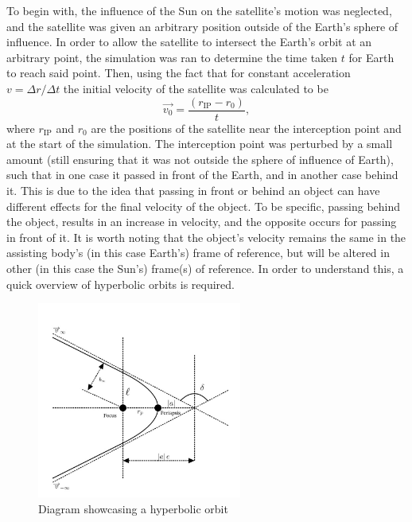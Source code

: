\documentclass[12pt, english]{report}
\begin{document}
{To begin with, the influence of the Sun on the satellite's motion was neglected, and the satellite was given an arbitrary position outside of the Earth's sphere of influence. In order to allow the satellite to intersect the Earth's orbit at an arbitrary point, the simulation was ran to determine the time taken $t$ for Earth to reach said point. Then, using the fact that for constant acceleration $v = \Delta r / \Delta t$ \cite{newton_principia_1999} the initial velocity of the satellite was calculated to be 
\begin{equation}
    \vec{v_0} = \frac{(r_{\mathrm{IP}} - r_0)}{t},
\end{equation}
\indent where $r_{\mathrm{IP}}$ and $r_0$ are the positions of the satellite near the interception point and at the start of the simulation. The interception point was perturbed by a small amount (still ensuring that it was not outside the sphere of influence of Earth), such that in one case it passed in front of the Earth, and in another case behind it. This is due to the idea that passing in front or behind an object can have different effects for the final velocity of the object. To be specific, passing behind the object, results in an increase in velocity, and the opposite occurs for passing in front of it. It is worth noting that the object's velocity remains the same in the assisting body's (in this case Earth's) frame of reference, but will be altered in other (in this case the Sun's) frame(s) of reference. In order to understand this, a quick overview of hyperbolic orbits is required.
\begin{figure}[ht]
    \centering
    \includegraphics[width=0.6\textwidth]{graphics/Orbits.jpg}
    \caption{Diagram showcasing a hyperbolic orbit}
    \label{fig:hyp_orbit}
\end{figure}

}
\end{document}
